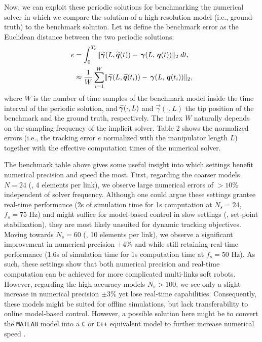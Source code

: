 Now, we can exploit these periodic solutions for benchmarking the numerical solver in which we compare the solution of a high-resolution model (i.e., ground truth) to the benchmark solution. Let us define the benchmark error as the Euclidean distance between the two periodic solutions:
%
\begin{align}
e & = \int^{T_c}_0 \lVert \,\widetilde{\!\boldsymbol{\gamma}}(L,\,\widetilde{\!\boldsymbol{q}}(t)) - \,\boldsymbol{\gamma}(L,\,{\boldsymbol{q}}(t)) \rVert_2 \; dt, \notag \\ & \approx \frac{1}{W}\sum_{i = 1}^{W} \lVert \,\widetilde{\!\boldsymbol{\gamma}}(L,\,\widetilde{\!\boldsymbol{q}}(t_i)) - \,\boldsymbol{\gamma}(L,\,{\boldsymbol{q}}(t_i)) \rVert_2,
\end{align}
%
where $W$ is the number of time samples of the benchmark model inside the time interval of the periodic solution, and $\widetilde{\!\boldsymbol{\gamma}}(\cdot,L)$ and $\vec{\gamma}(\cdot,L)$ the tip position of the benchmark and the ground truth, respectively. The index $W$ naturally depends on the sampling frequency of the implicit solver. Table 2 shows the normalized errors (i.e., the tracking error $e$ normalized with the manipulator length $L$) together with the effective computation times of the numerical solver.

The benchmark table above gives some useful insight into which settings benefit numerical precision and speed the most. First, regarding the coarser models $N = 24$ (\ie, 4 elements per link), we observe large numerical errors of $>\!10\%$ independent of solver frequency. Although one could argue these settings grantee real-time performance (2s of simulation time for 1s computation at $N_s = 24$, $f_s = 75$ Hz) and might suffice for model-based control in slow settings (\ie, set-point stabilization), they are most likely unsuited for dynamic tracking objectives. Moving towards $N_s = 60$ (\ie, 10 elements per link), we observe a significant improvement in numerical precision $\pm4\%$ and while still retaining real-time performance (1.6s of simulation time for 1s computation time at $f_s = 50$ Hz). As such, these settings show that both numerical precision and real-time computation can be achieved for more complicated multi-links soft robots. However, regarding the high-accuracy models $N_s > 100$, we see only a slight increase in numerical precision $\pm3\%$ yet lose real-time capabilities. Consequently, these models might be suited for offline simulations, but lack transferability to online model-based control. However, a possible solution here might be to convert the \texttt{MATLAB} model into a \texttt{C} or \texttt{C++} equivalent model to further increase numerical speed \cite{Grazioso2019,Sadati2020}.

